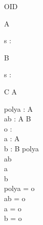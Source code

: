 \begin{zsection}
  \SECTION OID
\end{zsection}

\begin{class}{A}
  \begin{state}
    s : \nat
  \end{state}
\end{class}

\begin{class}{B}
  \begin{state}
    s : \nat
  \end{state}
\end{class}

\begin{class}{C}
  A\\
\end{class}

\begin{axdef}
  polya : \poly A\\
  ab : A \classuni B\\
  o : \oid\\
  a : A\\
  b : B
\where
  polya \in \oid\\
  ab \in \oid\\
  a \in \oid\\
  b \in \oid\\
  polya = o\\
  ab = o\\
  a = o\\
  b = o
\end{axdef}
